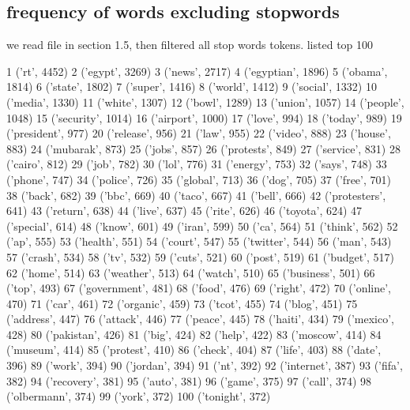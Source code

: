 \documentclass[a4paper, 11pt]{article}
\begin{document}
\subsection{frequency of words excluding stopwords}
we read file in section 1.5, then filtered all stop words tokens. \newline
listed top 100
\begin{spverbatim}
1 ('rt', 4452)
2 ('egypt', 3269)
3 ('news', 2717)
4 ('egyptian', 1896)
5 ('obama', 1814)
6 ('state', 1802)
7 ('super', 1416)
8 ('world', 1412)
9 ('social', 1332)
10 ('media', 1330)
11 ('white', 1307)
12 ('bowl', 1289)
13 ('union', 1057)
14 ('people', 1048)
15 ('security', 1014)
16 ('airport', 1000)
17 ('love', 994)
18 ('today', 989)
19 ('president', 977)
20 ('release', 956)
21 ('law', 955)
22 ('video', 888)
23 ('house', 883)
24 ('mubarak', 873)
25 ('jobs', 857)
26 ('protests', 849)
27 ('service', 831)
28 ('cairo', 812)
29 ('job', 782)
30 ('lol', 776)
31 ('energy', 753)
32 ('says', 748)
33 ('phone', 747)
34 ('police', 726)
35 ('global', 713)
36 ('dog', 705)
37 ('free', 701)
38 ('back', 682)
39 ('bbc', 669)
40 ('taco', 667)
41 ('bell', 666)
42 ('protesters', 641)
43 ('return', 638)
44 ('live', 637)
45 ('rite', 626)
46 ('toyota', 624)
47 ('special', 614)
48 ('know', 601)
49 ('iran', 599)
50 ('ca', 564)
51 ('think', 562)
52 ('ap', 555)
53 ('health', 551)
54 ('court', 547)
55 ('twitter', 544)
56 ('man', 543)
57 ('crash', 534)
58 ('tv', 532)
59 ('cuts', 521)
60 ('post', 519)
61 ('budget', 517)
62 ('home', 514)
63 ('weather', 513)
64 ('watch', 510)
65 ('business', 501)
66 ('top', 493)
67 ('government', 481)
68 ('food', 476)
69 ('right', 472)
70 ('online', 470)
71 ('car', 461)
72 ('organic', 459)
73 ('tcot', 455)
74 ('blog', 451)
75 ('address', 447)
76 ('attack', 446)
77 ('peace', 445)
78 ('haiti', 434)
79 ('mexico', 428)
80 ('pakistan', 426)
81 ('big', 424)
82 ('help', 422)
83 ('moscow', 414)
84 ('museum', 414)
85 ('protest', 410)
86 ('check', 404)
87 ('life', 403)
88 ('date', 396)
89 ('work', 394)
90 ('jordan', 394)
91 ('nt', 392)
92 ('internet', 387)
93 ('fifa', 382)
94 ('recovery', 381)
95 ('auto', 381)
96 ('game', 375)
97 ('call', 374)
98 ('olbermann', 374)
99 ('york', 372)
100 ('tonight', 372)	
\end{spverbatim}
\end{document}
